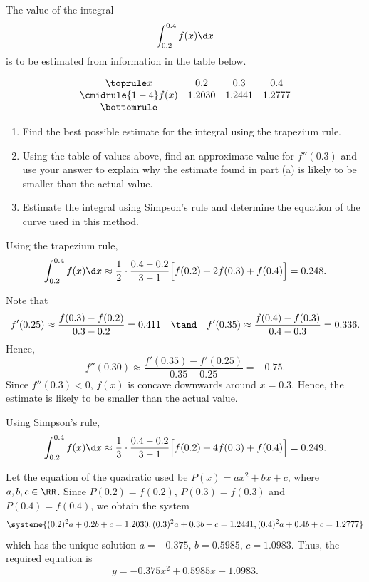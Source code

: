 \begin{problem}
    The value of the integral \[\int_{0.2}^{0.4} f(x) \d x\] is to be estimated from information in the table below.

    \[\begin{array}{c c c c}\toprule
            x & 0.2 & 0.3 & 0.4 \\\cmidrule{1-4}
            f(x) & 1.2030 & 1.2441 & 1.2777\\\bottomrule
        \end{array}\]

    \begin{enumerate}
        \item Find the best possible estimate for the integral using the trapezium rule.
        \item Using the table of values above, find an approximate value for $f''(0.3)$ and use your answer to explain why the estimate found in part (a) is likely to be smaller than the actual value.
        \item Estimate the integral using Simpson's rule and determine the equation of the curve used in this method.
    \end{enumerate}
\end{problem}
\clearpage
\begin{solution}
    \begin{ppart}
        Using the trapezium rule,
        \[\int_{0.2}^{0.4} f(x) \d x \approx \frac12 \cdot \frac{0.4 - 0.2}{3 - 1} \Big[f(0.2) + 2f(0.3) + f(0.4)\Big] = 0.248.\]
    \end{ppart}
    \begin{ppart}
        Note that \[f'(0.25) \approx \frac{f(0.3) - f(0.2)}{0.3 - 0.2} = 0.411 \quad \tand \quad f'(0.35) \approx \frac{f(0.4) - f(0.3)}{0.4 - 0.3} = 0.336.\] Hence, \[f''(0.30) \approx \frac{f'(0.35) - f'(0.25)}{0.35 - 0.25} = -0.75.\] Since $f''(0.3) < 0$, $f(x)$ is concave downwards around $x = 0.3$. Hence, the estimate is likely to be smaller than the actual value.
    \end{ppart}
    \begin{ppart}
        Using Simpson's rule,
        \[\int_{0.2}^{0.4} f(x) \d x \approx \frac13 \cdot \frac{0.4-0.2}{3 - 1} \Big[f(0.2) + 4f(0.3) + f(0.4)\Big] = 0.249.\]

        Let the equation of the quadratic used be $P(x) = ax^2 + bx + c$, where $a, b, c \in \RR$. Since $P(0.2) = f(0.2)$, $P(0.3) = f(0.3)$ and $P(0.4) = f(0.4)$, we obtain the system \[\systeme{(0.2)^2a + 0.2 b + c = 1.2030, (0.3)^2a + 0.3 b + c = 1.2441, (0.4)^2a + 0.4 b + c = 1.2777}\] which has the unique solution $a = -0.375$, $b = 0.5985$, $c = 1.0983$. Thus, the required equation is \[y = -0.375x^2 + 0.5985x + 1.0983.\]
    \end{ppart}
\end{solution}


